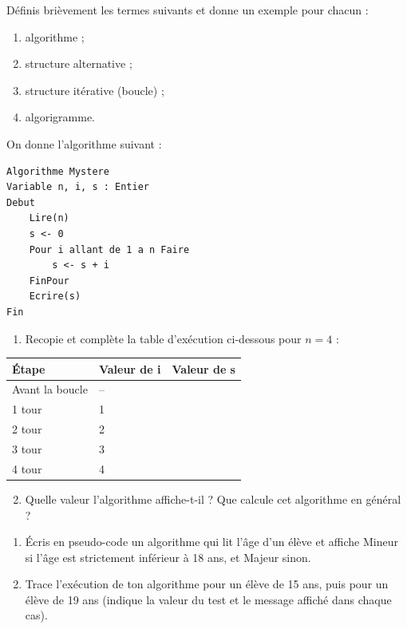 \documentclass[11pt]{article}
\newcounter{popsec}
\newcounter{popsub}
\newcommand{\courssub}[1]{%
  \stepcounter{popsub}%
  \par\vspace{9pt}\noindent{\popxbold\fontsize{11.5}{13}\selectfont\color{popink}{\color{poporange}\thepopsec.\thepopsub}\hspace{6pt}#1}\par\nopagebreak\vspace{4pt}
}
\begin{document}
\begin{exercice}[Définitions]
Définis brièvement les termes suivants et donne un exemple pour chacun :
\begin{enumerate}
\item algorithme ;
\item structure alternative ;
\item structure itérative (boucle) ;
\item algorigramme.
\end{enumerate}
\end{exercice}

\begin{exercice}
On donne l'algorithme suivant :
\begin{lstlisting}
Algorithme Mystere
Variable n, i, s : Entier
Debut
    Lire(n)
    s <- 0
    Pour i allant de 1 a n Faire
        s <- s + i
    FinPour
    Ecrire(s)
Fin
\end{lstlisting}
\begin{enumerate}
\item Recopie et complète la table d'exécution ci-dessous pour $n = 4$ :
\end{enumerate}
\begin{center}
\begin{tabularx}{\linewidth}{|l|X|X|}
\hline
\rowcolor{popblueL} \textbf{Étape} & \textbf{Valeur de i} & \textbf{Valeur de s} \\
\hline
Avant la boucle & -- & \\
\hline
1\ier{} tour & 1 & \\
\hline
2\ieme{} tour & 2 & \\
\hline
3\ieme{} tour & 3 & \\
\hline
4\ieme{} tour & 4 & \\
\hline
\end{tabularx}
\end{center}
\begin{enumerate}
\setcounter{enumi}{1}
\item Quelle valeur l'algorithme affiche-t-il ? Que calcule cet algorithme en général ?
\end{enumerate}
\end{exercice}

\courssub{Je m'entraîne}

\begin{exercice}
\begin{enumerate}
\item Écris en pseudo-code un algorithme qui lit l'âge d'un élève et affiche \og Mineur \fg{} si l'âge est strictement inférieur à 18 ans, et \og Majeur \fg{} sinon.
\item Trace l'exécution de ton algorithme pour un élève de 15 ans, puis pour un élève de 19 ans (indique la valeur du test et le message affiché dans chaque cas).
\end{enumerate}
\end{exercice}
\end{document}
